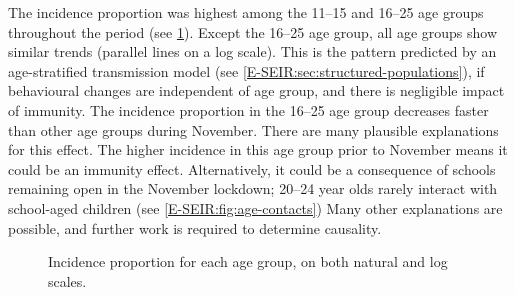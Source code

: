 \documentclass[thesis.tex]{subfiles}
\begin{document}
The incidence proportion was highest among the 11--15 and 16--25 age groups throughout the period (see \cref{transmission:fig:backcalc-ages}).
Except the 16--25 age group, all age groups show similar trends (\ie parallel lines on a log scale).
This is the pattern predicted by an age-stratified transmission model (see \cref{E-SEIR:sec:structured-populations}), if behavioural changes are independent of age group, and there is negligible impact of immunity.
The incidence proportion in the 16--25 age group decreases faster than other age groups during November.
There are many plausible explanations for this effect.
The higher incidence in this age group prior to November means it could be an immunity effect.
Alternatively, it could be a consequence of schools remaining open in the November lockdown; 20--24 year olds rarely interact with school-aged children (see \cref{E-SEIR:fig:age-contacts})
Many other explanations are possible, and further work is required to determine causality.
\begin{figure}
    \caption[Incidence estimated using backcalculation by age group]{%
        Incidence proportion for each age group, on both natural and log scales.
    }
    \label{transmission:fig:backcalc-ages}
\end{figure}
\end{document}
